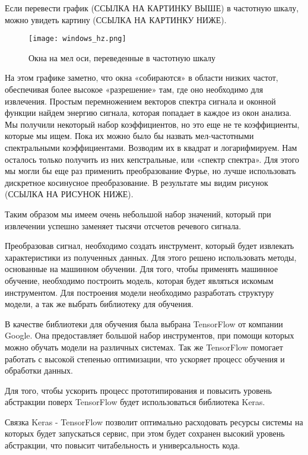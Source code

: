 Если перевести график (ССЫЛКА НА КАРТИНКУ ВЫШЕ) в частотную шкалу, можно увидеть картину (ССЫЛКА НА КАРТИНКУ НИЖЕ).

\begin{figure}
\centering
	\texttt{[image: windows\_hz.png]}
	\caption{Окна на мел оси, переведенные в частотную шкалу}
	\label{sec:design:dev:windows_mel}
\end{figure}

На этом графике заметно, что окна «собираются» в области низких частот, обеспечивая более высокое «разрешение» там, где оно необходимо для извлечения. Простым перемножением векторов спектра сигнала и оконной функции найдем энергию сигнала, которая попадает в каждое из окон анализа. Мы получили некоторый набор коэффициентов, но это еще не те коэффициенты, которые мы ищем. Пока их можно было бы назвать мел-частотными спектральными коэффициентами. Возводим их в квадрат и логарифмируем. Нам осталось только получить из них кепстральные, или «спектр спектра». Для этого мы могли бы еще раз применить преобразование Фурье, но лучше использовать дискретное косинусное преобразование. В результате мы видим рисунок (ССЫЛКА НА РИСУНОК НИЖЕ).

Таким образом мы имеем очень небольшой набор значений, который при извлечении успешно заменяет тысячи отсчетов речевого сигнала.

Преобразовав сигнал, необходимо создать инструмент, который будет извлекать характеристики из полученных данных. Для этого решено использовать методы, основанные на машинном обучении. Для того, чтобы применять машинное обучение, необходимо построить модель, которая будет являться искомым инструментом. Для построения модели необходимо разработать структуру модели, а так же выбрать библиотеку для обучения.

В качестве библиотеки для обучения была выбрана TensorFlow от компании Google. Она предоставляет большой набор инструментов, при помощи которых можно обучать модели на различных системах. Так же TensorFlow помогает работать с высокой степенью оптимизации, что ускоряет процесс обучения и обработки данных.

Для того, чтобы ускорить процесс прототипирования и повысить уровень абстракции поверх TensorFlow будет использоваться библиотека Keras.

Связка Keras - TensorFlow позволит оптимально расходовать ресурсы системы на которых будет запускаться сервис, при этом будет сохранен высокий уровень абстракции, что повысит читабельность и универсальность кода.

